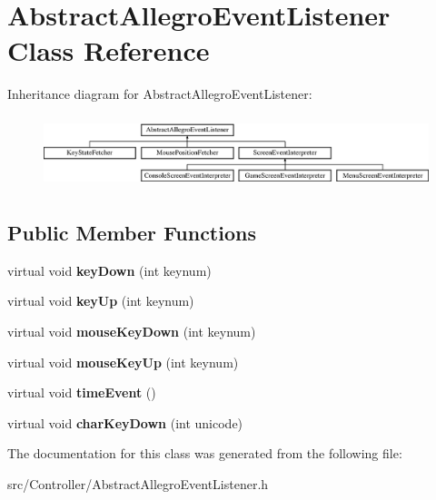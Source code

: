 \hypertarget{classAbstractAllegroEventListener}{}\section{Abstract\+Allegro\+Event\+Listener Class Reference}
\label{classAbstractAllegroEventListener}
Inheritance diagram for Abstract\+Allegro\+Event\+Listener\+:\begin{figure}[H]
\begin{center}
\leavevmode
\includegraphics[height=2.121212cm]{classAbstractAllegroEventListener}
\end{center}
\end{figure}
\subsection*{Public Member Functions}
\begin{DoxyCompactItemize}
\item 
virtual void {\bfseries key\+Down} (int keynum)\hypertarget{classAbstractAllegroEventListener_a90feb73dcf27ed7a59a414e0ec9b5dc7}{}\label{classAbstractAllegroEventListener_a90feb73dcf27ed7a59a414e0ec9b5dc7}

\item 
virtual void {\bfseries key\+Up} (int keynum)\hypertarget{classAbstractAllegroEventListener_a184ad8170383d387b1d74dbea49b17fe}{}\label{classAbstractAllegroEventListener_a184ad8170383d387b1d74dbea49b17fe}

\item 
virtual void {\bfseries mouse\+Key\+Down} (int keynum)\hypertarget{classAbstractAllegroEventListener_a0298053859a7fbf0112812472a36d742}{}\label{classAbstractAllegroEventListener_a0298053859a7fbf0112812472a36d742}

\item 
virtual void {\bfseries mouse\+Key\+Up} (int keynum)\hypertarget{classAbstractAllegroEventListener_a6d1c0f830af8870f4453961c491c2fff}{}\label{classAbstractAllegroEventListener_a6d1c0f830af8870f4453961c491c2fff}

\item 
virtual void {\bfseries time\+Event} ()\hypertarget{classAbstractAllegroEventListener_aef255f2df2f0096f6e15ddfac0367e23}{}\label{classAbstractAllegroEventListener_aef255f2df2f0096f6e15ddfac0367e23}

\item 
virtual void {\bfseries char\+Key\+Down} (int unicode)\hypertarget{classAbstractAllegroEventListener_ada1bdbac1038704d3b79b46af1b4221e}{}\label{classAbstractAllegroEventListener_ada1bdbac1038704d3b79b46af1b4221e}

\end{DoxyCompactItemize}


The documentation for this class was generated from the following file\+:\begin{DoxyCompactItemize}
\item 
src/\+Controller/Abstract\+Allegro\+Event\+Listener.\+h\end{DoxyCompactItemize}
